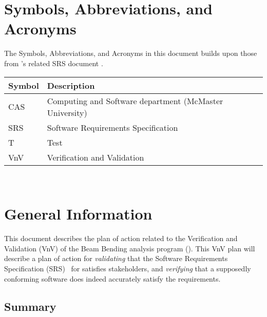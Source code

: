 \documentclass[12pt, titlepage]{article}
\begin{document}
\newpage

\section{Symbols, Abbreviations, and Acronyms}

The Symbols, Abbreviations, and Acronyms in this document builds upon those from
\progname{}'s related SRS document \cite{BalaciBeamBendingSRS2023}.\\

\renewcommand{\arraystretch}{1.2}
\begin{tabular}{l l}
    \toprule
    \textbf{Symbol} & \textbf{Description}                                    \\
    \midrule
    CAS             & Computing and Software department (McMaster University) \\
    SRS             & Software Requirements Specification                     \\
    T               & Test                                                    \\
    VnV             & Verification and Validation                             \\
    \bottomrule
\end{tabular}\\

\newpage



\section{General Information}

This document describes the plan of action related to the Verification and
Validation (VnV) of the Beam Bending analysis program (\progname{}). This VnV
plan will describe a plan of action for \textit{validating} that the Software
Requirements Specification (SRS)~\cite{BalaciBeamBendingSRS2023} for \progname{}
satisfies stakeholders, and \textit{verifying} that a supposedly conforming
software does indeed accurately satisfy the requirements.

\subsection{Summary}
\end{document}
